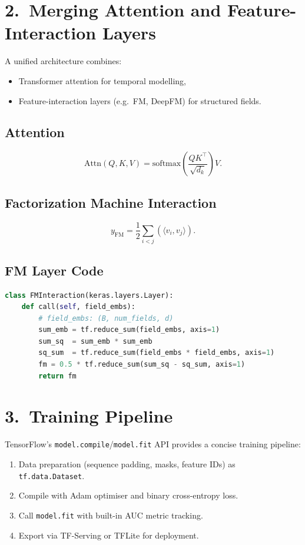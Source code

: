\documentclass[12pt]{article}
\begin{document}
\section{2.\ Merging Attention and Feature-Interaction Layers}
A unified architecture combines:
\begin{itemize}
    \item Transformer attention for temporal modelling,
    \item Feature-interaction layers (e.g.\ FM, DeepFM) for structured fields.
\end{itemize}

\subsection*{Attention}
\[
\mathrm{Attn}(Q,K,V)
= \mathrm{softmax}\!\left(\frac{QK^\top}{\sqrt{d_k}}\right)V.
\]

\subsection*{Factorization Machine Interaction}
\[
y_{\mathrm{FM}}
= \frac{1}{2}\sum_{i<j}
\left(
\langle v_i, v_j\rangle
\right).
\]

\subsection*{FM Layer Code}
\begin{lstlisting}[language=Python]
class FMInteraction(keras.layers.Layer):
    def call(self, field_embs):
        # field_embs: (B, num_fields, d)
        sum_emb = tf.reduce_sum(field_embs, axis=1)
        sum_sq  = sum_emb * sum_emb
        sq_sum  = tf.reduce_sum(field_embs * field_embs, axis=1)
        fm = 0.5 * tf.reduce_sum(sum_sq - sq_sum, axis=1)
        return fm
\end{lstlisting}

\section{3.\ Training Pipeline}
TensorFlow's \texttt{model.compile}/\texttt{model.fit} API provides a concise
training pipeline:
\begin{enumerate}
    \item Data preparation (sequence padding, masks, feature IDs) as \texttt{tf.data.Dataset}.
    \item Compile with Adam optimiser and binary cross-entropy loss.
    \item Call \texttt{model.fit} with built-in AUC metric tracking.
    \item Export via TF-Serving or TFLite for deployment.
\end{enumerate}
\end{document}
